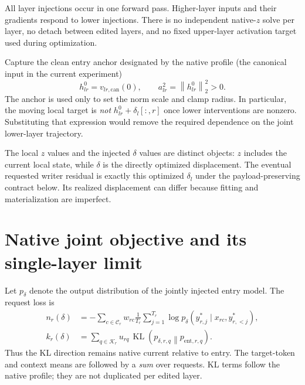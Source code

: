 \documentclass[11pt]{article}
\newcommand{\entry}{\mathrm{ent}}
\newcommand{\can}{\mathrm{can}}
\newcommand{\KL}{\operatorname{KL}}
\newcommand{\norm}[1]{\left\lVert#1\right\rVert}
\begin{document}
All layer injections occur in one forward pass. Higher-layer inputs and
their gradients respond to lower injections. There is no independent
native-$z$ solve per layer, no detach between edited layers, and no fixed
upper-layer activation target used during optimization.

Capture the clean entry anchor designated by the native profile (the
canonical input in the current experiment)
\begin{equation}
 h_{lr}^{0}=v_{lr,\can}(0),\qquad a_{lr}^2=\norm{h_{lr}^{0}}_2^2>0.
 \label{eq:anchor}
\end{equation}
The anchor is used only to set the norm scale and clamp radius. In
particular, the moving local target is \emph{not}
$h_{lr}^{0}+\delta_l[:,r]$ once lower interventions are nonzero.
Substituting that expression would remove the required dependence on the
joint lower-layer trajectory.

The local $z$ values and the injected $\delta$ values are distinct objects:
$z$ includes the current local state, while $\delta$ is the directly
optimized displacement. The eventual requested writer residual is exactly
this optimized $\delta_l$ under the payload-preserving contract below.
Its realized displacement can differ because fitting and materialization
are imperfect.

\clearpage
\section{Native joint objective and its single-layer limit}

Let $p_\delta$ denote the output distribution of the jointly injected entry
model. The request loss is
\begin{align}
 n_r(\delta)&=-\sum_{c\in\mathcal C_r}w_{rc}\frac1{T_r}
             \sum_{j=1}^{T_r}
             \log p_\delta(y_{r,j}^*\mid x_{rc},y_{r,<j}^*),\\
 k_r(\delta)&=\sum_{q\in\mathcal K_r}u_{rq}\,
             \KL\!\left(p_{\delta,r,q}\middle\|p_{\entry,r,q}\right).
\end{align}
Thus the KL direction remains native current relative to entry. The
target-token and context means are followed by a \emph{sum} over requests.
KL terms follow the native profile; they are not duplicated per edited layer.
\end{document}
